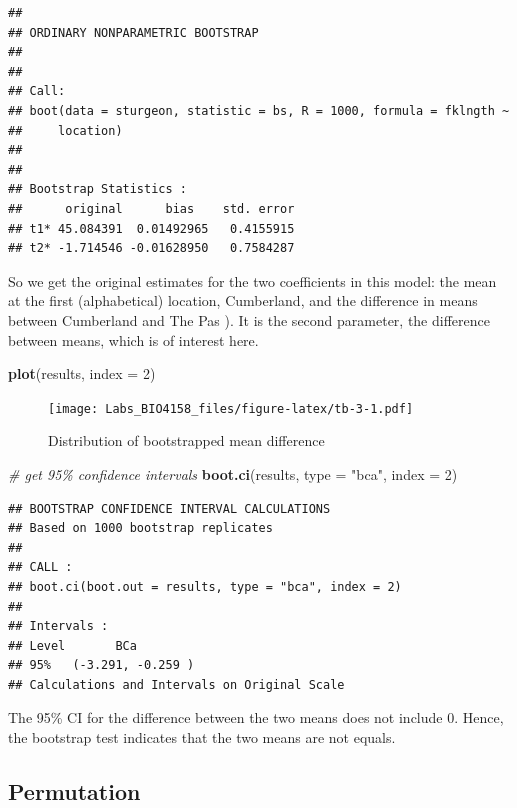 \documentclass[
  12pt,
]{book}
\newenvironment{Shaded}{\begin{snugshade}}{\end{snugshade}}
\newcommand{\CommentTok}[1]{\textcolor[rgb]{0.56,0.35,0.01}{\textit{#1}}}
\newcommand{\DataTypeTok}[1]{\textcolor[rgb]{0.13,0.29,0.53}{#1}}
\newcommand{\DecValTok}[1]{\textcolor[rgb]{0.00,0.00,0.81}{#1}}
\newcommand{\KeywordTok}[1]{\textcolor[rgb]{0.13,0.29,0.53}{\textbf{#1}}}
\newcommand{\NormalTok}[1]{#1}
\newcommand{\StringTok}[1]{\textcolor[rgb]{0.31,0.60,0.02}{#1}}
\begin{document}
\begin{verbatim}
## 
## ORDINARY NONPARAMETRIC BOOTSTRAP
## 
## 
## Call:
## boot(data = sturgeon, statistic = bs, R = 1000, formula = fklngth ~ 
##     location)
## 
## 
## Bootstrap Statistics :
##      original      bias    std. error
## t1* 45.084391  0.01492965   0.4155915
## t2* -1.714546 -0.01628950   0.7584287
\end{verbatim}

So we get the original estimates for the two coefficients in this model: the mean at the first (alphabetical) location, Cumberland, and the difference in means between Cumberland and The Pas ). It is the second parameter, the difference between means, which is of interest here.

\begin{Shaded}
\begin{Highlighting}[]
\KeywordTok{plot}\NormalTok{(results, }\DataTypeTok{index =} \DecValTok{2}\NormalTok{)}
\end{Highlighting}
\end{Shaded}

\begin{figure}
\centering
\texttt{[image: Labs\_BIO4158\_files/figure-latex/tb-3-1.pdf]}
\caption{\label{fig:tb-3}Distribution of bootstrapped mean difference}
\end{figure}

\begin{Shaded}
\begin{Highlighting}[]
\CommentTok{\# get 95\% confidence intervals}
\KeywordTok{boot.ci}\NormalTok{(results, }\DataTypeTok{type =} \StringTok{"bca"}\NormalTok{, }\DataTypeTok{index =} \DecValTok{2}\NormalTok{)}
\end{Highlighting}
\end{Shaded}

\begin{verbatim}
## BOOTSTRAP CONFIDENCE INTERVAL CALCULATIONS
## Based on 1000 bootstrap replicates
## 
## CALL : 
## boot.ci(boot.out = results, type = "bca", index = 2)
## 
## Intervals : 
## Level       BCa          
## 95%   (-3.291, -0.259 )  
## Calculations and Intervals on Original Scale
\end{verbatim}

The 95\% CI for the difference between the two means does not include 0. Hence, the bootstrap test indicates that the two means are not equals.

\hypertarget{permutation}{%
\subsection{Permutation}\label{permutation}}
\end{document}
